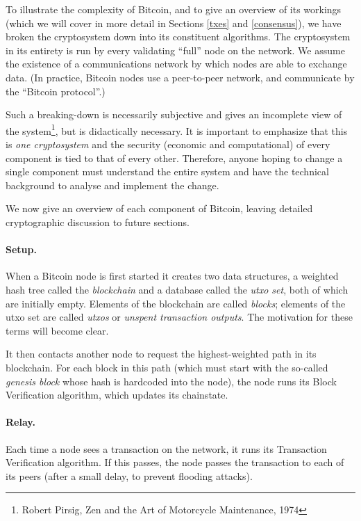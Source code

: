 \documentclass[letterpaper]{article}
\begin{document}
To illustrate the complexity of Bitcoin, and to give an overview of its
workings (which we will cover in more detail in Sections \ref{txes} and
\ref{consensus}), we have broken the cryptosystem
down into its constituent algorithms. The cryptosystem in its entirety is
run by every validating ``full'' node on the network. We assume the existence
of a communications network by which nodes are able to exchange data. (In
practice, Bitcoin nodes use a peer-to-peer network, and communicate by the
``Bitcoin protocol''.)

Such a breaking-down is necessarily subjective and gives an incomplete view
of the system\footnote{Robert Pirsig, Zen and the Art of Motorcycle Maintenance,
1974}, but is didactically necessary.
It is important to emphasize that this is \emph{one cryptosystem} and the
security (economic and computational) of every component is tied to that
of every other. Therefore, anyone hoping to change a single component must
understand the entire system and have the technical background to analyse
and implement the change.

We now give an overview of each component of Bitcoin, leaving detailed
cryptographic discussion to future sections.

\paragraph{Setup.} When a Bitcoin node is first started it creates two
data structures, a weighted hash tree called the \emph{blockchain} and
a database called the \emph{utxo set}, both of which are initially empty.
Elements of the blockchain are called \emph{blocks}; elements of the
utxo set are called \emph{utxos} or \emph{unspent transaction outputs}.
The motivation for these terms will become clear.

It then contacts another node to request the highest-weighted path in
its blockchain. For each block in this path (which must start with the
so-called \emph{genesis block} whose hash is hardcoded into the node),
the node runs its Block Verification algorithm, which updates its
chainstate.

\paragraph{Relay.} Each time a node sees a transaction on the network,
it runs its Transaction Verification algorithm. If this passes, the
node passes the transaction to each of its peers (after a small delay,
to prevent flooding attacks).
\end{document}
